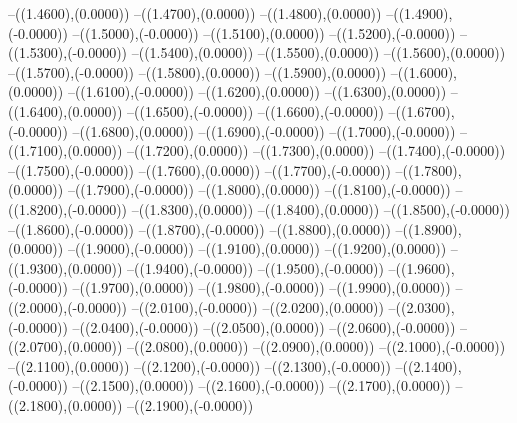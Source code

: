 {	--({\sx*(1.4600)},{\sy*(0.0000)})
	--({\sx*(1.4700)},{\sy*(0.0000)})
	--({\sx*(1.4800)},{\sy*(0.0000)})
	--({\sx*(1.4900)},{\sy*(-0.0000)})
	--({\sx*(1.5000)},{\sy*(-0.0000)})
	--({\sx*(1.5100)},{\sy*(0.0000)})
	--({\sx*(1.5200)},{\sy*(-0.0000)})
	--({\sx*(1.5300)},{\sy*(-0.0000)})
	--({\sx*(1.5400)},{\sy*(0.0000)})
	--({\sx*(1.5500)},{\sy*(0.0000)})
	--({\sx*(1.5600)},{\sy*(0.0000)})
	--({\sx*(1.5700)},{\sy*(-0.0000)})
	--({\sx*(1.5800)},{\sy*(0.0000)})
	--({\sx*(1.5900)},{\sy*(0.0000)})
	--({\sx*(1.6000)},{\sy*(0.0000)})
	--({\sx*(1.6100)},{\sy*(-0.0000)})
	--({\sx*(1.6200)},{\sy*(0.0000)})
	--({\sx*(1.6300)},{\sy*(0.0000)})
	--({\sx*(1.6400)},{\sy*(0.0000)})
	--({\sx*(1.6500)},{\sy*(-0.0000)})
	--({\sx*(1.6600)},{\sy*(-0.0000)})
	--({\sx*(1.6700)},{\sy*(-0.0000)})
	--({\sx*(1.6800)},{\sy*(0.0000)})
	--({\sx*(1.6900)},{\sy*(-0.0000)})
	--({\sx*(1.7000)},{\sy*(-0.0000)})
	--({\sx*(1.7100)},{\sy*(0.0000)})
	--({\sx*(1.7200)},{\sy*(0.0000)})
	--({\sx*(1.7300)},{\sy*(0.0000)})
	--({\sx*(1.7400)},{\sy*(-0.0000)})
	--({\sx*(1.7500)},{\sy*(-0.0000)})
	--({\sx*(1.7600)},{\sy*(0.0000)})
	--({\sx*(1.7700)},{\sy*(-0.0000)})
	--({\sx*(1.7800)},{\sy*(0.0000)})
	--({\sx*(1.7900)},{\sy*(-0.0000)})
	--({\sx*(1.8000)},{\sy*(0.0000)})
	--({\sx*(1.8100)},{\sy*(-0.0000)})
	--({\sx*(1.8200)},{\sy*(-0.0000)})
	--({\sx*(1.8300)},{\sy*(0.0000)})
	--({\sx*(1.8400)},{\sy*(0.0000)})
	--({\sx*(1.8500)},{\sy*(-0.0000)})
	--({\sx*(1.8600)},{\sy*(-0.0000)})
	--({\sx*(1.8700)},{\sy*(-0.0000)})
	--({\sx*(1.8800)},{\sy*(0.0000)})
	--({\sx*(1.8900)},{\sy*(0.0000)})
	--({\sx*(1.9000)},{\sy*(-0.0000)})
	--({\sx*(1.9100)},{\sy*(0.0000)})
	--({\sx*(1.9200)},{\sy*(0.0000)})
	--({\sx*(1.9300)},{\sy*(0.0000)})
	--({\sx*(1.9400)},{\sy*(-0.0000)})
	--({\sx*(1.9500)},{\sy*(-0.0000)})
	--({\sx*(1.9600)},{\sy*(-0.0000)})
	--({\sx*(1.9700)},{\sy*(0.0000)})
	--({\sx*(1.9800)},{\sy*(-0.0000)})
	--({\sx*(1.9900)},{\sy*(0.0000)})
	--({\sx*(2.0000)},{\sy*(-0.0000)})
	--({\sx*(2.0100)},{\sy*(-0.0000)})
	--({\sx*(2.0200)},{\sy*(0.0000)})
	--({\sx*(2.0300)},{\sy*(-0.0000)})
	--({\sx*(2.0400)},{\sy*(-0.0000)})
	--({\sx*(2.0500)},{\sy*(0.0000)})
	--({\sx*(2.0600)},{\sy*(-0.0000)})
	--({\sx*(2.0700)},{\sy*(0.0000)})
	--({\sx*(2.0800)},{\sy*(0.0000)})
	--({\sx*(2.0900)},{\sy*(0.0000)})
	--({\sx*(2.1000)},{\sy*(-0.0000)})
	--({\sx*(2.1100)},{\sy*(0.0000)})
	--({\sx*(2.1200)},{\sy*(-0.0000)})
	--({\sx*(2.1300)},{\sy*(-0.0000)})
	--({\sx*(2.1400)},{\sy*(-0.0000)})
	--({\sx*(2.1500)},{\sy*(0.0000)})
	--({\sx*(2.1600)},{\sy*(-0.0000)})
	--({\sx*(2.1700)},{\sy*(0.0000)})
	--({\sx*(2.1800)},{\sy*(0.0000)})
	--({\sx*(2.1900)},{\sy*(-0.0000)})
}
